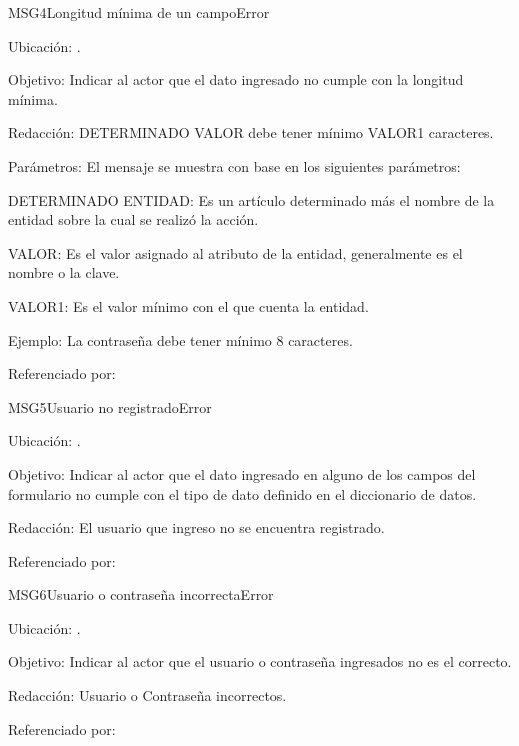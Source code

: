 \begin{mensaje}{MSG4}{Longitud mínima de un campo}{Error}
	\item[Ubicación:] \msjCampo.
	\item[Objetivo:] Indicar al actor que el dato ingresado no cumple con la longitud mínima.
	\item[Redacción:] DETERMINADO VALOR debe tener mínimo VALOR1 caracteres.
	\item[Parámetros:] El mensaje se muestra con base en los siguientes parámetros:
	\begin{Citemize}
		\item DETERMINADO ENTIDAD: Es un artículo determinado más el nombre de la entidad sobre la cual se realizó la acción.
		\item VALOR: Es el valor asignado al atributo de la entidad, generalmente es el nombre o la clave.
		\item VALOR1: Es el valor mínimo con el que cuenta la entidad.
	\end{Citemize}
	\item[Ejemplo:] La contraseña debe tener mínimo 8 caracteres.
	\item[Referenciado por:] 
\end{mensaje}

\begin{mensaje}{MSG5}{Usuario no registrado}{Error}
	\item[Ubicación:] \msjCampo.
	\item[Objetivo:] Indicar al actor que el dato ingresado en alguno de los campos del formulario no cumple con el tipo de dato definido en el diccionario de datos.
	\item[Redacción:] El usuario que ingreso no se encuentra registrado.
	\item[Referenciado por:] 
\end{mensaje}


\begin{mensaje}{MSG6}{Usuario o contraseña incorrecta}{Error}
	\item[Ubicación:] \msjCampo.
	\item[Objetivo:] Indicar al actor que el usuario o contraseña ingresados no es el correcto.
	\item[Redacción:] Usuario o Contraseña incorrectos.
	\item[Referenciado por:] 
\end{mensaje}


